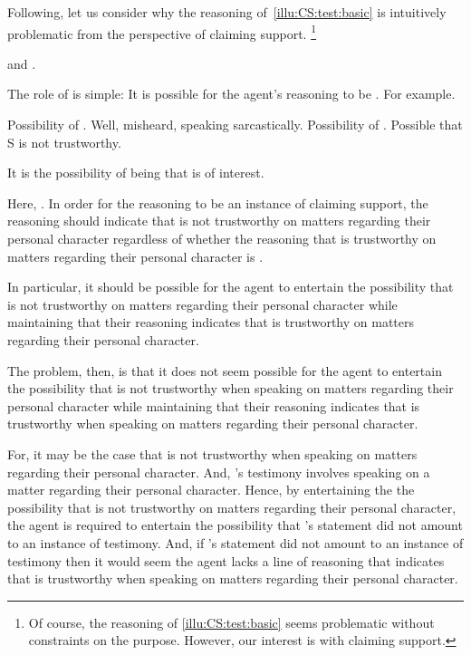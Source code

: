 \begin{note}
  Following, let us consider why the reasoning of~\autoref{illu:CS:test:basic} is intuitively problematic from the perspective of claiming support.\nolinebreak
  \footnote{
    Of course, the reasoning of \autoref{illu:CS:test:basic} seems problematic without constraints on the purpose.
    However, our interest is with claiming support.
  }

  \ideaS{} and \ideaCS{}.

  The role of \ideaS{} is simple: It is possible for the agent's reasoning to be \mom{}.
  For example.

  Possibility of \mistaken{}.
  Well, misheard, speaking sarcastically.
  Possibility of \misled{}.
  Possible that S is not trustworthy.

  It is the possibility of being \misled{} that is of interest.

  Here, \ideaCS{}.
  In order for the reasoning to be an instance of claiming support, the reasoning should indicate that  is not trustworthy on matters regarding their personal character regardless of whether the reasoning that  is trustworthy on matters regarding their personal character is \mom{}.

  In particular, it should be possible for the agent to entertain the possibility that  is not trustworthy on matters regarding their personal character while maintaining that their reasoning indicates that  is trustworthy on matters regarding their personal character.
\end{note}

\begin{note}
  The problem, then, is that it does not seem possible for the agent to entertain the possibility that  is not trustworthy when speaking on matters regarding their personal character while maintaining that their reasoning indicates that  is trustworthy when speaking on matters regarding their personal character.

  For, it may be the case that  is not trustworthy when speaking on matters regarding their personal character.
  And, 's testimony involves speaking on a matter regarding their personal character.
  Hence, by entertaining the the possibility that  is not trustworthy on matters regarding their personal character, the agent is required to entertain the possibility that 's statement did not amount to an instance of testimony.
  And, if 's statement did not amount to an instance of testimony then it would seem the agent lacks a line of reasoning that indicates that  is trustworthy when speaking on matters regarding their personal character.
\end{note}

